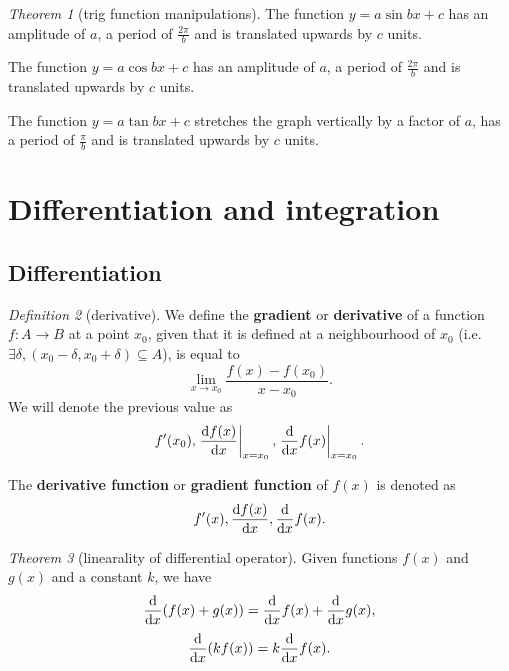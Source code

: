 \documentclass[8pt]{article}
\theoremstyle{remark}
\newtheorem{theorem}{Theorem}[section]
\newtheorem{definition}[theorem]{Definition}
\begin{document}
        \begin{theorem}[trig function manipulations]
            The function $y = a \sin bx + c$ has an amplitude of $a$, a period of $\frac{2\pi}{b}$ and is translated upwards by $c$ units.

            The function $y = a \cos bx + c$ has an amplitude of $a$, a period of $\frac{2\pi}{b}$ and is translated upwards by $c$ units.

            The function $y = a \tan bx + c$ stretches the graph vertically by a factor of $a$, has a period of $\frac{\pi}{b}$ and is translated upwards by $c$ units.
        \end{theorem}

    \section{Differentiation and integration}
        \subsection{Differentiation}

            \begin{definition}[derivative]
                We define the \textbf{gradient} or \textbf{derivative} of a function $f: A \rightarrow B$ at a point $x_0$, given that it is defined at a neighbourhood of $x_0$ (i.e. $\exists \delta, (x_0 - \delta, x_0 + \delta) \subseteq A$), is equal to
                $$
                    \lim_{x \rightarrow x_0} \frac{f(x) - f(x_0)}{x - x_0}.
                $$
                We will denote the previous value as
                $$
                    f'(x_0), \left. \frac{\mathrm{d} f(x)}{\mathrm{d} x} \right\vert _{ x = x_0 }, \left. \frac{\mathrm{d}}{\mathrm{d} x} f(x) \right\vert _{ x = x_0 }.
                $$

                The \textbf{derivative function} or \textbf{gradient function} of $f(x)$ is denoted as
                $$
                    f'(x), \frac{\mathrm{d} f(x)}{\mathrm{d} x}, \frac{\mathrm{d}}{\mathrm{d} x} f(x).
                $$
            \end{definition}

            \begin{theorem}[linearality of differential operator]
                Given functions $f(x)$ and $g(x)$ and a constant $k$, we have
                $$
                    \frac{\mathrm{d}}{\mathrm{d} x} (f(x) + g(x)) = \frac{\mathrm{d}}{\mathrm{d} x} f(x) + \frac{\mathrm{d}}{\mathrm{d} x} g(x),
                $$
                $$
                    \frac{\mathrm{d}}{\mathrm{d} x} (k f(x)) = k\frac{\mathrm{d}}{\mathrm{d} x} f(x).
                $$
            \end{theorem}
\end{document}
